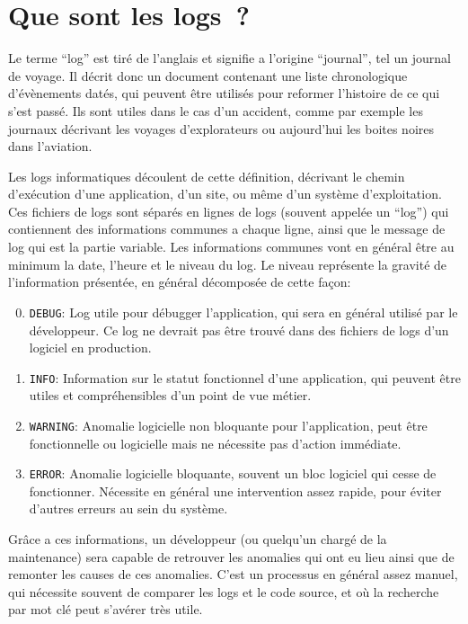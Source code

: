\documentclass[openany, 12pt]{memoir}
\begin{document}
\newpage
\section{Que sont les logs~?}
\label{logs}

Le terme ``log'' est tiré de l'anglais et signifie a l'origine ``journal'', tel un journal de voyage. Il décrit donc un document contenant une liste chronologique d'évènements datés, qui peuvent être utilisés pour reformer l'histoire de ce qui s'est passé. Ils sont utiles dans le cas d'un accident, comme par exemple les journaux décrivant les voyages d'explorateurs ou aujourd'hui les boites noires dans l'aviation.

Les logs informatiques découlent de cette définition, décrivant le chemin d'exécution d'une application, d'un site, ou même d'un système d'exploitation. Ces fichiers de logs sont séparés en lignes de logs (souvent appelée un ``log'') qui contiennent des informations communes a chaque ligne, ainsi que le message de log qui est la partie variable. Les informations communes vont en général être au minimum la date, l'heure et le niveau du log. Le niveau représente la gravité de l'information présentée, en général décomposée de cette façon:

\begin{enumerate}
	\setcounter{enumi}{-1}
	\item \texttt{DEBUG}: Log utile pour débugger l'application, qui sera en général utilisé par le développeur. Ce log ne devrait pas être trouvé dans des fichiers de logs d'un logiciel en production.
	\item \texttt{INFO}: Information sur le statut fonctionnel d'une application, qui peuvent être utiles et compréhensibles d'un point de vue métier.
	\item \texttt{WARNING}: Anomalie logicielle non bloquante pour l'application, peut être fonctionnelle ou logicielle mais ne nécessite pas d'action immédiate.
	\item \texttt{ERROR}: Anomalie logicielle bloquante, souvent un bloc logiciel qui cesse de fonctionner. Nécessite en général une intervention assez rapide, pour éviter d'autres erreurs au sein du système.
\end{enumerate}

Grâce a ces informations, un développeur (ou quelqu'un chargé de la maintenance) sera capable de retrouver les anomalies qui ont eu lieu ainsi que de remonter les causes de ces anomalies. C'est un processus en général assez manuel, qui nécessite souvent de comparer les logs et le code source, et où la recherche par mot clé peut s'avérer très utile.
\end{document}

